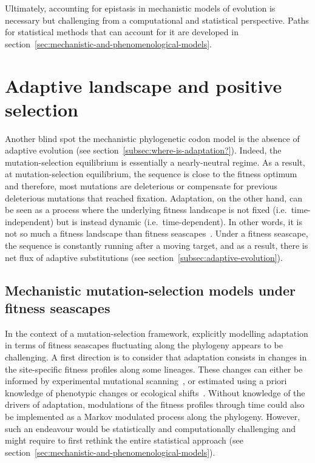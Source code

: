 Ultimately, accounting for epistasis in mechanistic models of evolution is necessary but challenging from a computational and statistical perspective.
Paths for statistical methods that can account for it are developed in section~\ref{sec:mechanistic-and-phenomenological-models}.

\section{Adaptive landscape and positive selection}
\label{sec:adaptative-landscape}

Another blind spot the mechanistic phylogenetic \gls{codon} model is the absence of adaptive evolution (see section~\ref{subsec:where-is-adaptation?}).
Indeed, the mutation-selection equilibrium is essentially a \gls{nearly-neutral} regime.
As a result, at mutation-selection equilibrium, the sequence is close to the fitness optimum and therefore, most mutations are deleterious or compensate for previous deleterious mutations that reached fixation.
Adaptation, on the other hand, can be seen as a process where the underlying fitness landscape is not fixed (i.e.~time-independent) but is instead dynamic (i.e.~time-dependent).
In other words, it is not so much a fitness landscape than fitness seascapes~\citep{Mustonen2009}.
Under a fitness seascape, the sequence is constantly running after a moving target, and as a result, there is net flux of adaptive \glspl{substitution} (see section~\ref{subsec:adaptive-evolution}).

\subsection{Mechanistic mutation-selection models under fitness seascapes}
\label{subsec:mechanistic-fluctuating-selection}

In the context of a mutation-selection framework, explicitly modelling adaptation in terms of fitness seascapes fluctuating along the phylogeny appears to be challenging.
A first direction is to consider that adaptation consists in changes in the site-specific fitness profiles along some lineages.
These changes can either be informed by experimental mutational scanning~\citep{Bloom2017}, or estimated using a priori knowledge of phenotypic changes or ecological shifts~\citep{Tamuri2009, Parto2017, Parto2018}.
Without knowledge of the drivers of adaptation, modulations of the fitness profiles through time could also be implemented as a Markov modulated process along the phylogeny.
However, such an endeavour would be statistically and computationally challenging and might require to first rethink the entire statistical approach (see section~\ref{sec:mechanistic-and-phenomenological-models}).

